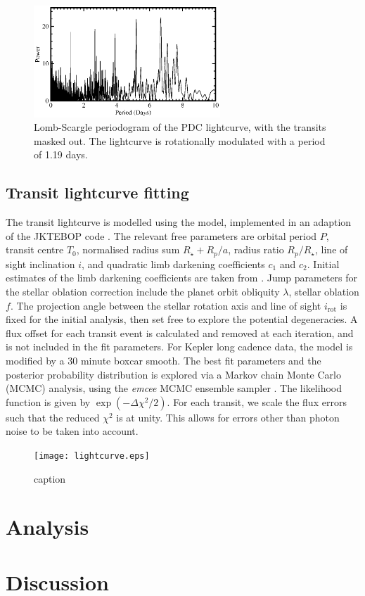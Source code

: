 \documentclass[preprint]{emulateapj}
\begin{document}
\begin{figure}[h!]
  \centering
  \includegraphics[width=7cm]{LS.eps}
  \caption{Lomb-Scargle periodogram of the PDC lightcurve, with the
    transits masked out. The lightcurve is rotationally modulated with
  a period of 1.19 days.}
  \label{fig:LS}
\end{figure}

\subsection{Transit lightcurve fitting}
\label{sec:transit-light-curve}

The transit lightcurve is modelled using the
\citet{1972ApJ...174..617N} model, implemented in an adaption of the
JKTEBOP code \citep{1981AJ.....86..102P,2004MNRAS.351.1277S}. The
relevant free parameters are orbital period $P$, transit centre $T_0$,
normalised radius sum $R_\star+R_p / a$, radius ratio $R_p/R_\star$,
line of sight inclination $i$, and quadratic limb darkening
coefficients $c_1$ and $c_2$. Initial estimates of the limb darkening
coefficients are taken from \citet{2010A&amp;A...510A..21S}. Jump
parameters for the stellar oblation correction include the planet
orbit obliquity $\lambda$, stellar oblation $f$. The projection angle
between the stellar rotation axis and line of sight $i_\text{rot}$ is
fixed for the initial analysis, then set free to explore the potential
degeneracies. A flux offset for each transit event is calculated and
removed at each iteration, and is not included in the fit
parameters. For Kepler long cadence data, the model is modified by a
30 minute boxcar smooth. The best fit parameters and the posterior
probability distribution is explored via a Markov chain Monte Carlo
(MCMC) analysis, using the \emph{emcee} MCMC ensemble sampler
\citep{2012arXiv1202.3665F}. The likelihood function is given by
$\exp(-\Delta\chi^2/2)$. For each transit, we scale the flux errors such
that the reduced $\chi^2$ is at unity. This allows for errors other
than photon noise to be taken into account.

\begin{figure}[h!]
  \centering
  \texttt{[image: lightcurve.eps]}
  \caption{caption}
  \label{fig:lightcurve}
\end{figure}

\section{Analysis}
\label{sec:analysis}

\section{Discussion}
\label{sec:discussion}



\end{document}
